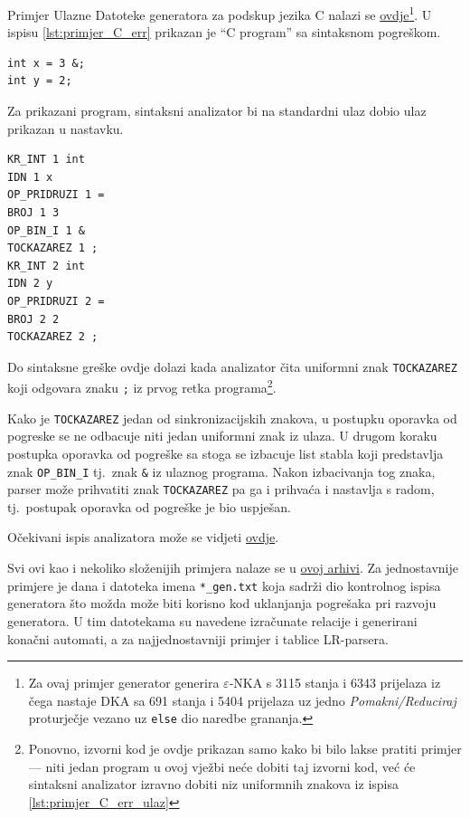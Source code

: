\documentclass[times, 12pt, utf8]{book}
\begin{document}
Primjer Ulazne Datoteke generatora za podskup jezika C nalazi se \href{https://github.com/fer-ppj/ppj-labosi/raw/master/res/lab2/simplePpjLang.san}{ovdje}\footnote{Za ovaj primjer generator generira \(\varepsilon\)-NKA s 3115 stanja i 6343 prijelaza iz čega nastaje DKA sa 691 stanja i 5404 prijelaza uz jedno \emph{Pomakni/Reduciraj} proturječje vezano uz \texttt{else} dio naredbe grananja.}.
U ispisu \ref{lst:primjer_C_err} prikazan je ``C program'' sa sintaksnom pogreškom.

\begin{lstlisting}[caption={Jednostavan C program sa sintaksnom greškom.},label=lst:primjer_C_err]
int x = 3 &;
int y = 2;

\end{lstlisting}

Za prikazani program, sintaksni analizator bi na standardni ulaz dobio ulaz prikazan u nastavku.

\begin{lstlisting}[caption={Ulaz za sintaksni analizator za program \ref{lst:primjer_C_err}.},label=lst:primjer_C_err_ulaz]
KR_INT 1 int
IDN 1 x
OP_PRIDRUZI 1 =
BROJ 1 3
OP_BIN_I 1 &
TOCKAZAREZ 1 ;
KR_INT 2 int
IDN 2 y
OP_PRIDRUZI 2 =
BROJ 2 2
TOCKAZAREZ 2 ;

\end{lstlisting}

Do sintaksne greške ovdje dolazi kada analizator čita uniformni znak \verb|TOCKAZAREZ| koji odgovara znaku \verb|;| iz prvog retka programa\footnote{Ponovno, izvorni kod je ovdje prikazan samo kako bi bilo lakse pratiti primjer --- niti jedan program u ovoj vježbi neće dobiti taj izvorni kod, već će sintaksni analizator izravno dobiti niz uniformnih znakova iz ispisa \ref{lst:primjer_C_err_ulaz}}.

Kako je \verb|TOCKAZAREZ| jedan od sinkronizacijskih znakova, u postupku oporavka od pogreske se ne odbacuje niti jedan uniformni znak iz ulaza.
U drugom koraku postupka oporavka od pogreške sa stoga se izbacuje list stabla koji predstavlja znak \verb|OP_BIN_I| tj.~znak \verb|&| iz ulaznog programa.
Nakon izbacivanja tog znaka, parser može prihvatiti znak \verb|TOCKAZAREZ| pa ga i prihvaća i nastavlja s radom, tj.~postupak oporavka od pogreške je bio uspješan.

Očekivani ispis analizatora može se vidjeti \href{https://github.com/fer-ppj/ppj-labosi/raw/master/res/lab2/simplePpjLang_err.out}{ovdje}.

Svi ovi kao i nekoliko složenijih primjera nalaze se u \href{https://github.com/fer-ppj/ppj-labosi/raw/master/res/lab2/langdefs.zip}{ovoj arhivi}.
Za jednostavnije primjere je dana i datoteka imena \verb|*_gen.txt| koja sadrži dio kontrolnog ispisa generatora što možda može biti korisno kod uklanjanja pogrešaka pri razvoju generatora.
U tim datotekama su navedene izračunate relacije i generirani konačni automati, a za najjednostavniji primjer i tablice LR-parsera.
\end{document}
